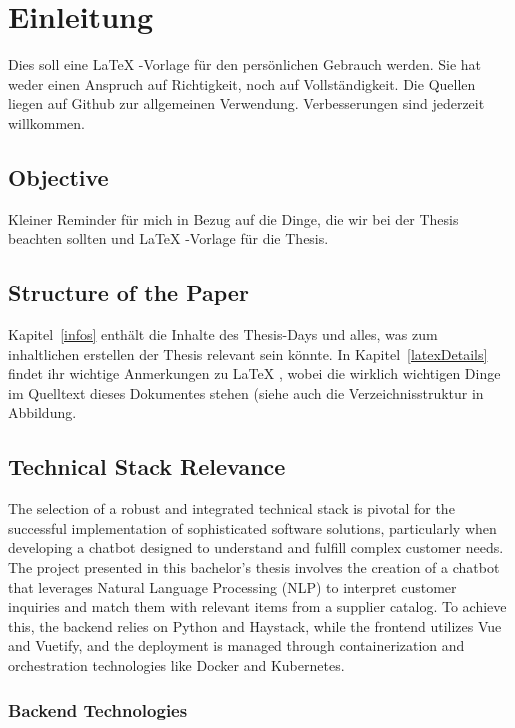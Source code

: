 \section{Einleitung}
Dies soll eine \LaTeX{}
-Vorlage für den persönlichen Gebrauch werden.
Sie hat weder einen Anspruch auf Richtigkeit, noch auf Vollständigkeit.
Die Quellen liegen auf Github zur allgemeinen Verwendung.
Verbesserungen sind jederzeit willkommen.

\subsection{Objective}
Kleiner Reminder für mich in Bezug auf die Dinge, die wir bei der Thesis beachten sollten und \LaTeX{}
-Vorlage für die Thesis.\autocite{syedQuestionAnsweringChatbot2021}

\subsection{Structure of the Paper}
Kapitel~\ref{infos}
enthält die Inhalte des Thesis-Days und alles, was zum inhaltlichen erstellen der Thesis relevant sein könnte.
In
Kapitel~\ref{latexDetails}~ findet ihr wichtige Anmerkungen zu \LaTeX{}
, wobei die wirklich wichtigen Dinge im Quelltext dieses Dokumentes stehen (siehe auch die Verzeichnisstruktur in
Abbildung.

\subsection{Technical Stack Relevance}

The selection of a robust and integrated technical stack is pivotal for the successful implementation of sophisticated
software solutions, particularly when developing a chatbot designed to understand and fulfill complex customer needs.
The project presented in this bachelor’s thesis involves the creation of a chatbot that leverages Natural Language
Processing (NLP) to interpret customer inquiries and match them with relevant items from a supplier catalog.
To achieve
this, the backend relies on Python and Haystack, while the frontend utilizes Vue and Vuetify, and the deployment is
managed through containerization and orchestration technologies like Docker and Kubernetes.

\subsubsection{Backend Technologies}

